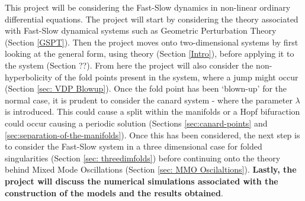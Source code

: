 This project will be considering the Fast-Slow dynamics in non-linear ordinary differential equations. The project will start by considering the theory associated with Fast-Slow dynamical systems such as Geometric Perturbation Theory (Section \ref{GSPT}). Then the project moves onto two-dimensional systems by first looking at the general form, using \citet{krupa2001} theory (Section \ref{Intro}), before applying it to the \vdp system (Section ??). From here the project will also consider the non-hyperbolicity of the fold points present in the system, where a jump might occur (Section \ref{sec: VDP Blowup}). Once the fold point has been `blown-up' for the normal case, it is prudent to consider the canard system - where the parameter $ \lambda $ is introduced. This could cause a split within the manifolds or a Hopf bifuraction could occur causing a periodic solution (Sections \ref{sec:canard-points} and \ref{sec:separation-of-the-manifolds}). Once this has been considered, the next step is to consider the Fast-Slow system in a three dimensional case for folded singularities (Section \ref{sec: threedimfolds}) before continuing onto the theory behind Mixed Mode Oscillations (Section \ref{sec: MMO Oscilaltions}). \textbf{Lastly, the project will discuss the numerical simulations associated with the construction of the models and the results obtained}.